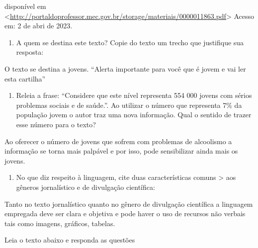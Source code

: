 disponível em
\textless{}\href{http://portaldoprofessor.mec.gov.br/storage/materiais/0000011863.pdf}{\uline{http://portaldoprofessor.mec.gov.br/storage/materiais/0000011863.pdf}}\textgreater{}
Acesso em: 2 de abri de 2023.

\begin{enumerate}
\def\labelenumi{\alph{enumi})}
\tightlist
\item
  A quem se destina este texto? Copie do texto um trecho que justifique
  sua resposta:
\end{enumerate}

O texto se destina a jovens. ``Alerta importante para você que é jovem e
vai ler esta cartilha''

\begin{enumerate}
\def\labelenumi{\alph{enumi})}
\setcounter{enumi}{1}
\tightlist
\item
  Releia a frase: ``Considere que este nível representa 554 000 jovens
  com sérios problemas sociais e de saúde.''. Ao utilizar o número que
  representa 7\% da população jovem o autor traz uma nova informação.
  Qual o sentido de trazer esse número para o texto?
\end{enumerate}

Ao oferecer o número de jovens que sofrem com problemas de alcoolismo a
informação se torna mais palpável e por isso, pode sensibilizar ainda
mais os jovens.

\begin{enumerate}
\def\labelenumi{\arabic{enumi})}
\setcounter{enumi}{6}
\tightlist
\item
  No que diz respeito à linguagem, cite duas características comuns
  \textgreater{} aos gêneros jornalístico e de divulgação científica:
\end{enumerate}

Tanto no texto jornalístico quanto no gênero de divulgação científica a
linguagem empregada deve ser clara e objetiva e pode haver o uso de
recursos não verbais tais como imagens, gráficos, tabelas.

Leia o texto abaixo e responda as questões

